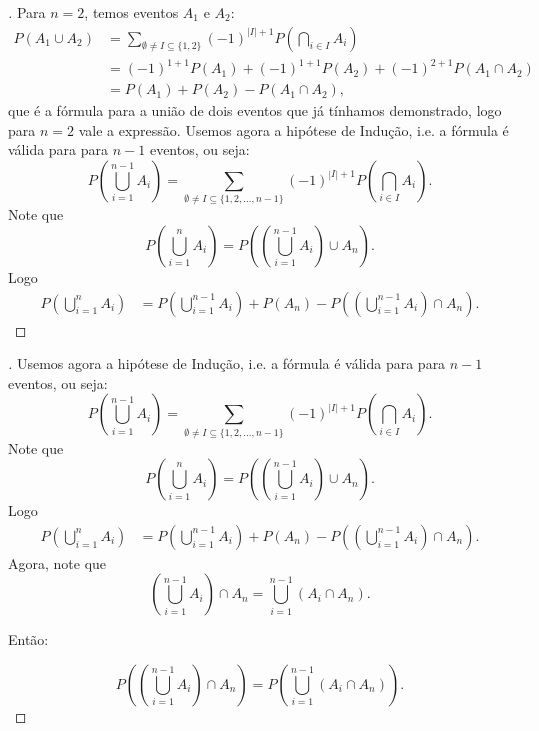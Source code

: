 \begin{frame}
\begin{proof}[]
Para \( n = 2 \), temos eventos \( A_1 \) e \( A_2 \): \[
\begin{aligned}
	P(A_1 \cup A_2) &= \sum_{\emptyset \ne I \subseteq \{1,2\}} (-1)^{|I|+1} P\left( \bigcap_{i \in I} A_i \right) \\
	&= (-1)^{1+1} P(A_1) + (-1)^{1+1} P(A_2) + (-1)^{2+1} P(A_1 \cap A_2) \\
	&= P(A_1) + P(A_2) - P(A_1 \cap A_2),
\end{aligned}
\]
que é a fórmula para a união de dois eventos que já tínhamos demonstrado, logo para \( n = 2 \) vale a expressão.
Usemos agora a hipótese de Indução,  i.e. a fórmula é válida para para \( n - 1 \) eventos, ou seja:
\[
P\left( \bigcup_{i=1}^{n-1} A_i \right) = \sum_{\emptyset \ne I \subseteq \{1,2,\ldots,n-1\}} (-1)^{|I|+1} P\left( \bigcap_{i \in I} A_i \right).
\]
Note que
\[
P\left( \bigcup_{i=1}^{n} A_i \right) = P\left( \left( \bigcup_{i=1}^{n-1} A_i \right) \cup A_n \right).
\]
Logo 
\[
\begin{aligned}
	P\left( \bigcup_{i=1}^{n} A_i \right) &= P\left( \bigcup_{i=1}^{n-1} A_i \right) + P(A_n) - P\left( \left( \bigcup_{i=1}^{n-1} A_i \right) \cap A_n \right).
\end{aligned}
\]

\end{proof}
\end{frame}

\begin{frame}
	\begin{proof}[]
		
Usemos agora a hipótese de Indução,  i.e. a fórmula é válida para para \( n - 1 \) eventos, ou seja:
\[
P\left( \bigcup_{i=1}^{n-1} A_i \right) = \sum_{\emptyset \ne I \subseteq \{1,2,\ldots,n-1\}} (-1)^{|I|+1} P\left( \bigcap_{i \in I} A_i \right).
\]
Note que
\[
P\left( \bigcup_{i=1}^{n} A_i \right) = P\left( \left( \bigcup_{i=1}^{n-1} A_i \right) \cup A_n \right).
\]
Logo 
\[
\begin{aligned}
	P\left( \bigcup_{i=1}^{n} A_i \right) &= P\left( \bigcup_{i=1}^{n-1} A_i \right) + P(A_n) - P\left( \left( \bigcup_{i=1}^{n-1} A_i \right) \cap A_n \right).
\end{aligned}
\]
Agora, note que 
\[
\left( \bigcup_{i=1}^{n-1} A_i \right) \cap A_n = \bigcup_{i=1}^{n-1} (A_i \cap A_n).
\]

Então:

\[
P\left( \left( \bigcup_{i=1}^{n-1} A_i \right) \cap A_n \right) = P\left( \bigcup_{i=1}^{n-1} (A_i \cap A_n) \right).
\]
\end{proof}
\end{frame}

